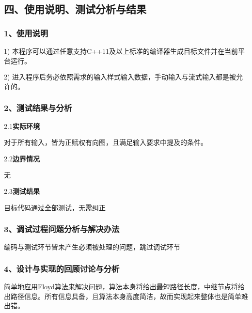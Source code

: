 \documentclass[UTF8, a4paper]{ctexart}
\begin{document}
\subsection*{四、使用说明、测试分析与结果}
\subsubsection*{1、使用说明}
1) 本程序可以通过任意支持C++11及以上标准的编译器生成目标文件并在当前平台运行。 \par
2) 进入程序后务必依照需求的输入样式输入数据，手动输入与流式输入都是被允许的。 \par
\subsubsection*{2、测试结果与分析}
2.1\;\textbf{实际环境} \par
对于所有输入，皆为正赋权有向图，且满足输入要求中提及的条件。 \par
2.2\;\textbf{边界情况} \par
无 \par
2.3\;\textbf{测试结果} \par
目标代码通过全部测试，无需纠正 \par
\subsubsection*{3、调试过程问题分析与解决办法}
编码与测试环节皆未产生必须被处理的问题，跳过调试环节 \par
\subsubsection*{4、设计与实现的回顾讨论与分析}
简单地应用Floyd算法来解决问题，算法本身将给出最短路径长度，中继节点将给出路径信息。所有信息具备，且算法本身高度简洁，故而实现起来整体也是简单难出错。 \par
\end{document}
